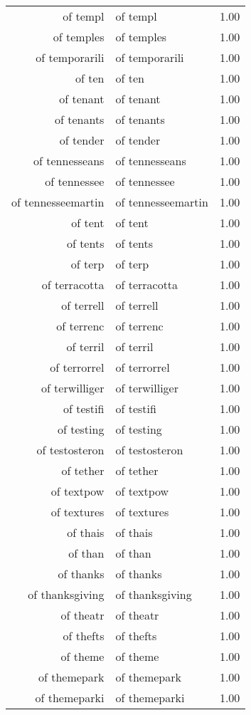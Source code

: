 \begin{table}[ht]
\begin{tabular}{rlr}
  of templ & of templ & 1.00 \\ 
  of temples & of temples & 1.00 \\ 
  of temporarili & of temporarili & 1.00 \\ 
  of ten & of ten & 1.00 \\ 
  of tenant & of tenant & 1.00 \\ 
  of tenants & of tenants & 1.00 \\ 
  of tender & of tender & 1.00 \\ 
  of tennesseans & of tennesseans & 1.00 \\ 
  of tennessee & of tennessee & 1.00 \\ 
  of tennesseemartin & of tennesseemartin & 1.00 \\ 
  of tent & of tent & 1.00 \\ 
  of tents & of tents & 1.00 \\ 
  of terp & of terp & 1.00 \\ 
  of terracotta & of terracotta & 1.00 \\ 
  of terrell & of terrell & 1.00 \\ 
  of terrenc & of terrenc & 1.00 \\ 
  of terril & of terril & 1.00 \\ 
  of terrorrel & of terrorrel & 1.00 \\ 
  of terwilliger & of terwilliger & 1.00 \\ 
  of testifi & of testifi & 1.00 \\ 
  of testing & of testing & 1.00 \\ 
  of testosteron & of testosteron & 1.00 \\ 
  of tether & of tether & 1.00 \\ 
  of textpow & of textpow & 1.00 \\ 
  of textures & of textures & 1.00 \\ 
  of thais & of thais & 1.00 \\ 
  of than & of than & 1.00 \\ 
  of thanks & of thanks & 1.00 \\ 
  of thanksgiving & of thanksgiving & 1.00 \\ 
  of theatr & of theatr & 1.00 \\ 
  of thefts & of thefts & 1.00 \\ 
  of theme & of theme & 1.00 \\ 
  of themepark & of themepark & 1.00 \\ 
  of themeparki & of themeparki & 1.00 \\ 

\end{tabular}
\end{table}
